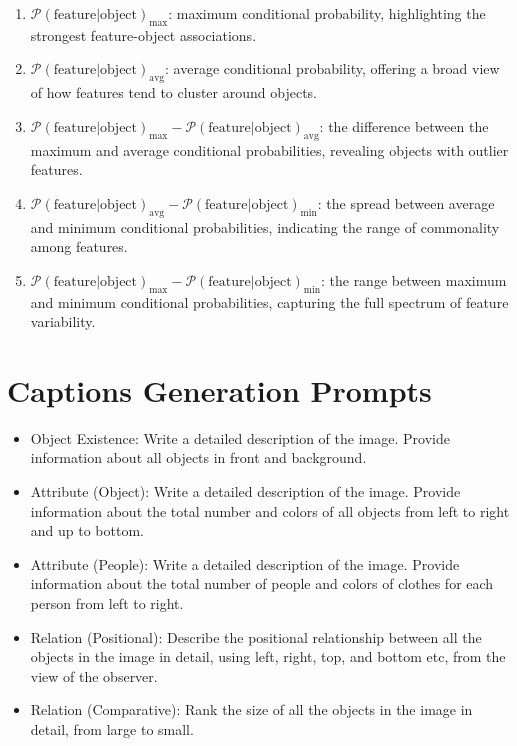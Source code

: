 \begin{enumerate}
    \item $\mathcal{P}(\text{feature}|\text{object})_\text{max}$: maximum conditional probability, highlighting the strongest feature-object associations.
    \item $\mathcal{P}(\text{feature}|\text{object})_\text{avg}$: average conditional probability, offering a broad view of how features tend to cluster around objects.
    \item $\mathcal{P}(\text{feature}|\text{object})_\text{max} -\mathcal{P}(\text{feature}|\text{object})_\text{avg}$: the difference between the maximum and average conditional probabilities, revealing objects with outlier features.
    \item $\mathcal{P}(\text{feature}|\text{object})_\text{avg} -\mathcal{P}(\text{feature}|\text{object})_\text{min}$: the spread between average and minimum conditional probabilities, indicating the range of commonality among features.
    \item $\mathcal{P}(\text{feature}|\text{object})_\text{max} -\mathcal{P}(\text{feature}|\text{object})_\text{min}$: the range between maximum and minimum conditional probabilities, capturing the full spectrum of feature variability.
\end{enumerate}

\section{Captions Generation Prompts}
\label{apx:caption_generation_prompts}

\begin{itemize}

    \item Object Existence: Write a detailed description of the image. Provide information about all objects in front and background.
    \item Attribute (Object): Write a detailed description of the image. Provide information about the total number and colors of all objects from left to right and up to bottom.
    \item Attribute (People): Write a detailed description of the image. Provide information about the total number of people and colors of clothes for each person from left to right.
    \item Relation (Positional): Describe the positional relationship between all the objects in the image in detail, using left, right, top, and bottom etc, from the view of the observer.
    \item Relation (Comparative): Rank the size of all the objects in the image in detail, from large to small.
\end{itemize}

